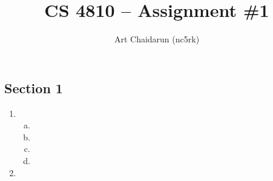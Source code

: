 \documentclass[letterpaper,12pt]{article}
\begin{document}
\title{\vspace{-0.5in}CS 4810 -- Assignment \#1}
\author{Art Chaidarun (nc5rk)}
\renewcommand{\today}{February 12, 2013}
\maketitle
\thispagestyle{empty}
\pagestyle{empty}

\subsection*{Section 1}

\begin{enumerate}
  \item
    \begin{enumerate}[a.]
      \item
      \item
      \item
      \item
    \end{enumerate}
  \item
\end{enumerate}
\end{document}
